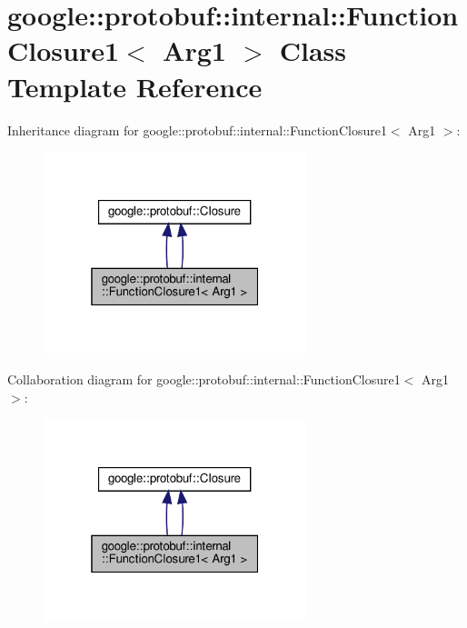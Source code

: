 \hypertarget{classgoogle_1_1protobuf_1_1internal_1_1FunctionClosure1}{}\section{google\+:\+:protobuf\+:\+:internal\+:\+:Function\+Closure1$<$ Arg1 $>$ Class Template Reference}
\label{classgoogle_1_1protobuf_1_1internal_1_1FunctionClosure1}


Inheritance diagram for google\+:\+:protobuf\+:\+:internal\+:\+:Function\+Closure1$<$ Arg1 $>$\+:
\nopagebreak
\begin{figure}[H]
\begin{center}
\leavevmode
\includegraphics[width=217pt]{classgoogle_1_1protobuf_1_1internal_1_1FunctionClosure1__inherit__graph}
\end{center}
\end{figure}


Collaboration diagram for google\+:\+:protobuf\+:\+:internal\+:\+:Function\+Closure1$<$ Arg1 $>$\+:
\nopagebreak
\begin{figure}[H]
\begin{center}
\leavevmode
\includegraphics[width=217pt]{classgoogle_1_1protobuf_1_1internal_1_1FunctionClosure1__coll__graph}
\end{center}
\end{figure}
